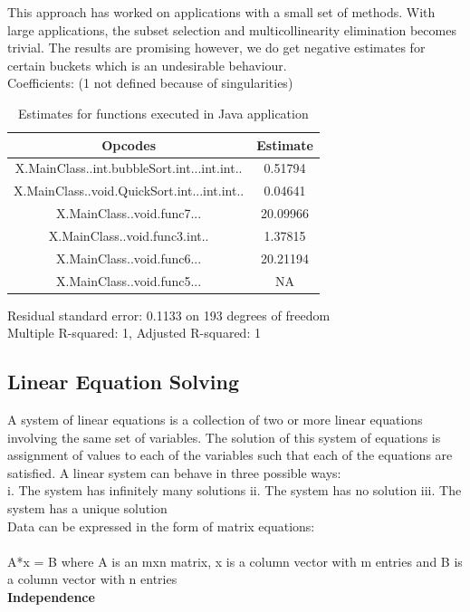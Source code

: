 \documentclass[11pt]{article}
\begin{document}
This approach has worked on applications with a small set of methods. With large applications, the subset selection and multicollinearity elimination becomes trivial. The results are promising however, we do get negative estimates for certain buckets which is an undesirable behaviour. \\

Coefficients: (1 not defined because of singularities)\newline
\begin{table}[h!]
\begin{center}
 \begin{tabular}{ |c|c| }
 \hline
 Opcodes&Estimate\\
 \hline
 X.MainClass..int.bubbleSort.int...int.int..&0.51794\\   
X.MainClass..void.QuickSort.int...int.int..&0.04641\\
X.MainClass..void.func7...&20.09966\\
X.MainClass..void.func3.int..&1.37815\\
X.MainClass..void.func6...&20.21194\\
X.MainClass..void.func5...&NA\\
\hline
\end{tabular}
\end{center}
\caption{Estimates for functions executed in Java application}
\label{Linear Regression results: }
\end{table}

Residual standard error: 0.1133 on 193 degrees of freedom\\
Multiple R-squared:      1,	Adjusted R-squared:      1 \newline

\newpage

\subsection{Linear Equation Solving}
A system of linear equations is a collection of two or more linear equations involving the same set of variables.\citep{lineareqn} The solution of this system of equations is assignment of values to each of the variables such that each of the equations are satisfied. A linear system can behave in three possible ways:\newline
\\i. The system has infinitely many solutions\newline
ii. The system has no solution\newline
iii. The system has a unique solution\newline
\\Data can be expressed in the form of matrix equations:\\
\\A*x = B\newline
where A is an mxn matrix, x is a column vector with m entries and B is a column vector with n entries\newline
\\\textbf{Independence}
\end{document}

